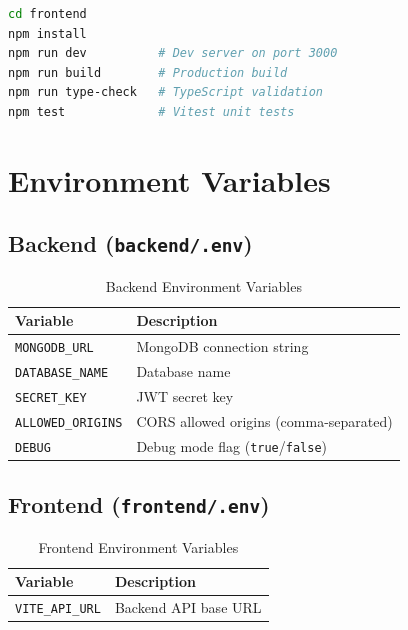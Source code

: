 \documentclass[10pt,a4paper]{report}
\begin{document}
\begin{lstlisting}[language=bash]
cd frontend
npm install
npm run dev          # Dev server on port 3000
npm run build        # Production build
npm run type-check   # TypeScript validation
npm test             # Vitest unit tests
\end{lstlisting}

\section{Environment Variables}

\subsection{Backend (\texttt{backend/.env})}

\begin{table}[h]
    \centering
    \begin{tabular}{|l|l|}
        \hline
        \textbf{Variable}        & \textbf{Description}                            \\
        \hline
        \texttt{MONGODB\_URL}    & MongoDB connection string                       \\
        \hline
        \texttt{DATABASE\_NAME}  & Database name                                   \\
        \hline
        \texttt{SECRET\_KEY}     & JWT secret key                                  \\
        \hline
        \texttt{ALLOWED\_ORIGINS}& CORS allowed origins (comma-separated)          \\
        \hline
        \texttt{DEBUG}           & Debug mode flag (\texttt{true}/\texttt{false})  \\
        \hline
    \end{tabular}
    \caption{Backend Environment Variables}
\end{table}

\subsection{Frontend (\texttt{frontend/.env})}

\begin{table}[h]
    \centering
    \begin{tabular}{|l|l|}
        \hline
        \textbf{Variable}          & \textbf{Description}                          \\
        \hline
        \texttt{VITE\_API\_URL}    & Backend API base URL                          \\
        \hline
    \end{tabular}
    \caption{Frontend Environment Variables}
\end{table}
\end{document}
